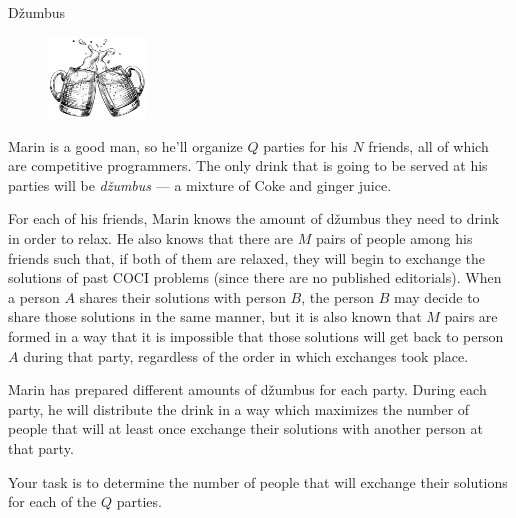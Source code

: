 \begin{statement}[
  problempoints=110,
  timelimit=1 second,
  memorylimit=512 MiB,
]{Džumbus}

\setlength\intextsep{-0.1cm}
\begin{figure}
\centering
\includegraphics[width=0.23\textwidth]{img/dzumbus.png}
\end{figure}


Marin is a good man, so he'll organize $Q$ parties for his $N$ friends, all of
which are competitive programmers. The only drink that is going to be served at
his parties will be \textit{džumbus} --- a mixture of Coke and ginger juice.

For each of his friends, Marin knows the amount of džumbus they need to
drink in order to relax. He also knows that there are $M$ pairs of people among
his friends such that, if both of them are relaxed, they will begin to
exchange the solutions of past COCI problems (since there are no
published editorials). When a person $A$ shares their solutions with person $B$,
the person $B$ may decide to share those solutions in the same manner, but it is
also known that $M$ pairs are formed in a way that it is impossible that those
solutions will get back to person $A$ during that party, regardless of the order in
which exchanges took place.

Marin has prepared different amounts of džumbus for each party. During each
party, he will distribute the drink in a way which maximizes the number of
people that will at least once exchange their solutions with another person
at that party.

Your task is to determine the number of people that will exchange their
solutions for each of the $Q$ parties.

\end{statement}
